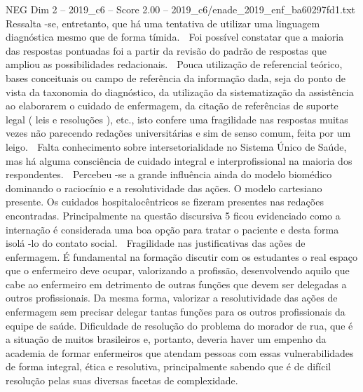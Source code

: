 \begin{textsample}{NEG Dim 2 – 2019\_c6 – Score 2.00 – 2019\_c6/enade\_2019\_enf\_ba60297fd1.txt}
Ressalta -se, entretanto, que há uma tentativa de utilizar uma linguagem diagnóstica mesmo que de forma tímida.  Foi possível constatar que a maioria das respostas pontuadas foi a partir da revisão do padrão de respostas que ampliou as possibilidades redacionais.  Pouca utilização de referencial teórico, bases conceituais ou campo de referência da informação dada, seja do ponto de vista da taxonomia do diagnóstico, da utilização da sistematização da assistência ao elaborarem o cuidado de enfermagem, da citação de referências de suporte legal ( leis e resoluções ), etc., isto confere uma fragilidade nas respostas muitas vezes não parecendo redações universitárias e sim de senso comum, feita por um leigo.  Falta conhecimento sobre intersetorialidade no Sistema Único de Saúde, mas há alguma consciência de cuidado integral e interprofissional na maioria dos respondentes.  Percebeu -se a grande influência ainda do modelo biomédico dominando o raciocínio e a resolutividade das ações.
O modelo cartesiano presente.
Os cuidados hospitalocêntricos se fizeram presentes nas redações encontradas.
Principalmente na questão discursiva 5 ficou evidenciado como a internação é considerada uma boa opção para tratar o paciente e desta forma isolá -lo do contato social.  Fragilidade nas justificativas das ações de enfermagem.
É fundamental na formação discutir com os estudantes o real espaço que o enfermeiro deve ocupar, valorizando a profissão, desenvolvendo aquilo que cabe ao enfermeiro em detrimento de outras funções que devem ser delegadas a outros profissionais.
Da mesma forma, valorizar a resolutividade das ações de enfermagem sem precisar delegar tantas funções para os outros profissionais da equipe de saúde.
Dificuldade de resolução do problema do morador de rua, que é a situação de muitos brasileiros e, portanto, deveria haver um empenho da academia de formar enfermeiros que atendam pessoas com essas vulnerabilidades de forma integral, ética e resolutiva, principalmente sabendo que é de difícil resolução pelas suas diversas facetas de complexidade.

\end{textsample}
